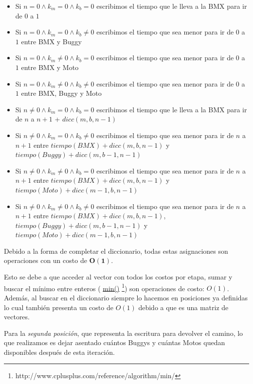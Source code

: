 \begin{itemize}
\item Si $n=0 \wedge k_m=0 \wedge k_b=0$ escribimos el tiempo que le lleva a la BMX para ir de $0$ a $1$
\item Si $n=0 \wedge k_m=0 \wedge k_b\neq0$ escribimos el tiempo que sea menor para ir  de $0$ a $1$ entre BMX y Buggy
\item Si $n=0 \wedge k_m\neq0 \wedge k_b=0$ escribimos el tiempo que sea menor para ir  de $0$ a $1$ entre BMX y Moto
\item Si $n=0 \wedge k_m\neq0 \wedge k_b\neq0$ escribimos el tiempo que sea menor para ir  de $0$ a $1$ entre BMX, Buggy y Moto
\item Si $n\neq0 \wedge k_m=0 \wedge k_b=0$ escribimos el tiempo que le lleva a la BMX para ir de $n$ a $n+1$ + $dicc(m, b, n-1)$
\item Si $n\neq0 \wedge k_m=0 \wedge k_b\neq0$ escribimos el tiempo que sea menor para ir  de $n$ a $n+1$ entre $tiempo(BMX) + dicc(m, b, n-1)$ y $tiempo(Buggy) + dicc(m, b-1, n-1)$
\item Si $n\neq0 \wedge k_m\neq0 \wedge k_b=0$ escribimos el tiempo que sea menor para ir  de $n$ a $n+1$ entre $tiempo(BMX) + dicc(m, b, n-1)$ y $tiempo(Moto) + dicc(m-1, b, n-1)$
\item Si $n\neq0 \wedge k_m\neq0 \wedge k_b\neq0$ escribimos el tiempo que sea menor para ir  de $n$ a $n+1$ entre $tiempo(BMX) + dicc(m, b, n-1)$, $tiempo(Buggy) + dicc(m, b-1, n-1)$ y $tiempo(Moto) + dicc(m-1, b, n-1)$
\end{itemize}

Debido a la forma de completar el diccionario, todas estas asignaciones son operaciones con un costo de $\mathbf{O(1)}$. 

Esto se debe a que acceder al vector con todos los costos por etapa, sumar y buscar el m\'inimo entre enteros ( \href{http://www.cplusplus.com/reference/algorithm/min/}{min()} \footnote{http://www.cplusplus.com/reference/algorithm/min/}) son operaciones de costo: $O(1)$. Adem\'as, al buscar en el diccionario siempre lo hacemos en posiciones ya definidas lo cual tambi\'en presenta un costo de $O(1)$ debido a que es una matriz de vectores.\\

\newpage

Para la \emph{segunda posici\'on}, que representa la escritura para devolver el camino, lo que realizamos es dejar asentado cu\'antos Buggys y cu\'antas Motos quedan disponibles despu\'es de esta iteraci\'on. 

